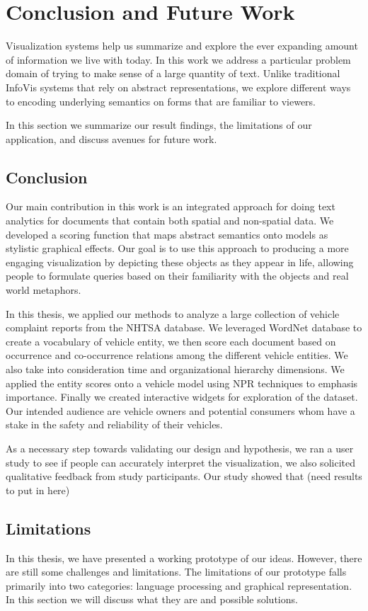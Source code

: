 \chapter{Conclusion and Future Work}
Visualization systems help us summarize and explore the ever expanding amount of
information we live with today. In this work we address a particular problem
domain of trying to make sense of a large quantity of text. Unlike traditional
InfoVis systems that rely on abstract representations, we explore different ways
to encoding underlying semantics on forms that are familiar to viewers. 

In this section we summarize our result findings, the limitations of our
application, and discuss avenues for future work.

\section{Conclusion}
Our main contribution in this work is an integrated approach for doing text
analytics for documents that contain both spatial and non-spatial data. We
developed a scoring function that maps abstract semantics onto \threed models as
stylistic graphical effects. Our goal is to use this approach to producing a
more engaging visualization by depicting these objects as they appear in life,
allowing people to formulate queries based on their familiarity with the objects
and real world metaphors.

In this thesis, we applied our methods to analyze a large collection of vehicle
complaint reports from the NHTSA database. We leveraged WordNet database to
create a vocabulary of vehicle entity, we then score each document based on
occurrence and co-occurrence relations among the different vehicle entities.
We also take into consideration time and organizational hierarchy dimensions. We
applied the entity scores onto a \threed vehicle model using NPR techniques to
emphasis importance. Finally we created interactive widgets for exploration of
the dataset. Our intended audience are vehicle owners and potential consumers
whom have a stake in the safety and reliability of their vehicles.


As a necessary step towards validating our design and hypothesis, we ran a user
study to see if people can accurately interpret the visualization, we also
solicited qualitative feedback from study participants. Our study showed that
(need results to put in here)


\section{Limitations}
In this thesis, we have presented a working prototype of our ideas. However,
there are still some challenges and limitations. The limitations of our
prototype falls primarily into two categories: language processing and graphical
representation. In this section we will discuss what they are and possible
solutions.

